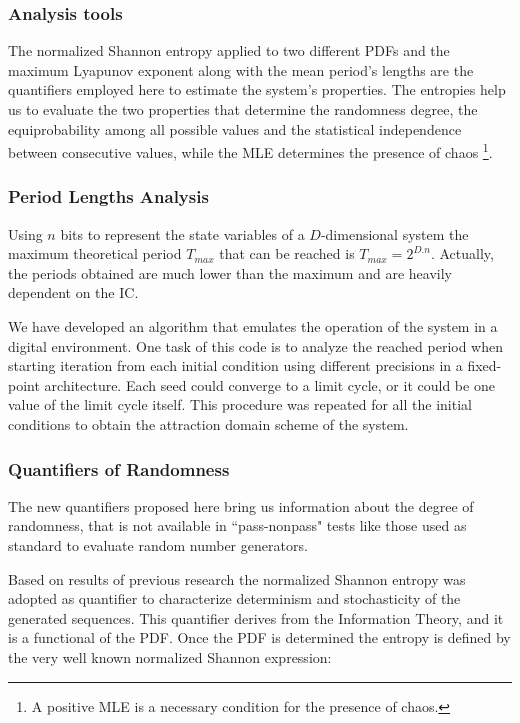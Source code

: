 \subsubsection{Analysis tools}
\label{sec:quanti}

The normalized Shannon entropy applied to two different PDFs and the maximum Lyapunov exponent along with the mean period's lengths are the quantifiers employed here to estimate the system's properties. The entropies   help us to evaluate the two properties that determine the randomness degree, the equiprobability among all possible values and the statistical independence between consecutive values, while the MLE determines the presence of chaos \footnote{A positive MLE is a necessary condition for the presence of chaos.}. 
 
\subsubsection{Period Lengths Analysis}
Using $n$ bits to represent the state variables of a $D$-dimensional system the maximum theoretical period $T_{max}$ that can be reached is $T_{max}=2^{D.n}$. Actually, the periods obtained are much lower than the maximum and are heavily dependent on the IC.

We have developed an algorithm that emulates the operation of the system in a digital environment. One task of this code is to analyze the reached period when starting iteration from each initial condition using different precisions in a fixed-point architecture. Each seed could converge to a limit cycle, or it could be one value of the limit cycle itself. This procedure was repeated for all the initial conditions to obtain the attraction domain scheme of the
system.

\subsubsection{Quantifiers of Randomness}
\label{cu_ran}

The new quantifiers proposed here bring us information about the degree of randomness, that is not available in ``pass-nonpass" tests like those used as standard to evaluate random number generators.

Based on results of previous research \cite{DeMicco2008,Antonelli2016,DeMicco2011} the normalized Shannon entropy was adopted as quantifier to characterize determinism and stochasticity of the generated sequences. This quantifier derives from the Information Theory, and it is a functional of the PDF. Once the PDF is determined the entropy is defined by the very well known normalized Shannon expression:


